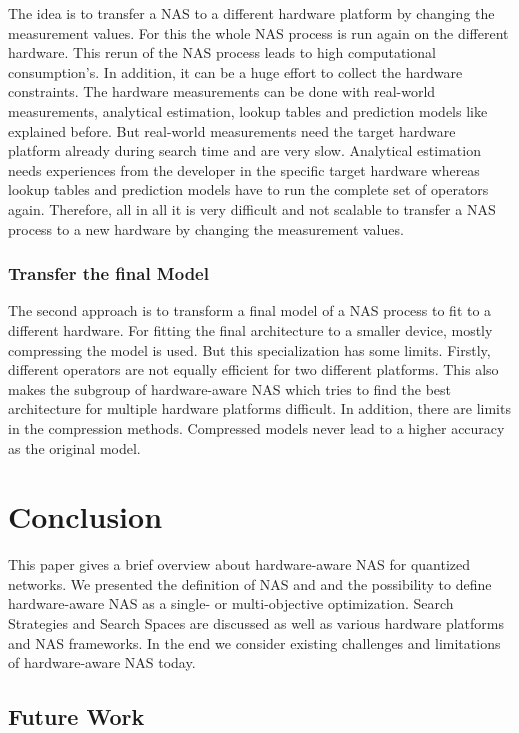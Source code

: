 \documentclass[conference]{IEEEtran}
\begin{document}
The idea is to transfer a NAS to a different hardware platform by changing the measurement values. For this the whole NAS process is run again on the different hardware. This rerun of the NAS process leads to high computational consumption's. In addition, it can be a huge effort to collect the hardware constraints. The hardware measurements can be done with real-world measurements, analytical estimation, lookup tables and prediction models like explained before. But real-world measurements need the target hardware platform already during search time and are very slow. Analytical estimation needs experiences from the developer in the specific target hardware whereas lookup tables and prediction models have to run the complete set of operators again. Therefore, all in all it is very difficult and not scalable to transfer a NAS process to a new hardware by changing the measurement values. 

\subsubsection{Transfer the final Model}

The second approach is to transform a final model of a NAS process to fit to a different hardware. For fitting the final architecture to a smaller device, mostly compressing the model is used. But this specialization has some limits. Firstly, different operators are not equally efficient for two different platforms. This also makes the subgroup of hardware-aware NAS which tries to find the best architecture for multiple hardware platforms difficult. In addition, there are limits in the compression methods. Compressed models never lead to a higher accuracy as the original model. 

\section{Conclusion}

This paper gives a brief overview about hardware-aware NAS for quantized networks. We presented the definition of NAS and and the possibility to define hardware-aware NAS as a single- or multi-objective optimization. Search Strategies and Search Spaces are discussed as well as various hardware platforms and NAS frameworks. In the end we consider existing challenges and limitations of hardware-aware NAS today.

\subsection{Future Work}
\end{document}
